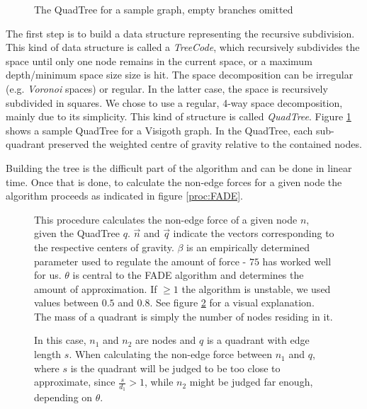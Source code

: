 \documentclass[a4paper,11pt,titlepage]{article}
\begin{document}
\begin{figure}[ht!]
  \centering
  \hspace{4pt}
  \caption{The QuadTree for a sample graph, empty branches omitted}
  \label{fig:quadtree}
\end{figure}

The first step is to build a data structure representing the recursive
subdivision. This kind of data structure is called a \emph{TreeCode},
which recursively subdivides the space until only one node remains in
the current space, or a maximum depth/minimum space size size is
hit. The space decomposition can be irregular (e.g. \emph{Voronoi}
spaces) or regular. In the latter case, the space is recursively
subdivided in squares. We chose to use a regular, 4-way space
decomposition, mainly due to its simplicity. This kind of structure is
called \emph{QuadTree}. Figure \ref{fig:quadtree} shows a sample
QuadTree for a Visigoth graph. In the QuadTree, each sub-quadrant
preserved the weighted centre of gravity relative to the contained
nodes.

Building the tree is the difficult part of the algorithm and can be
done in linear time. Once that is done, to calculate the non-edge
forces for a given node the algorithm proceeds as indicated in figure
\ref{proc:FADE}.

\begin{figure}[ht!]
  \begin{minipage}[b]{0.5\linewidth}
    
    \caption{This procedure calculates the non-edge force of a given
      node \(n\), given the QuadTree \(q\). \(\vec{n}\) and
      \(\vec{q}\) indicate the vectors corresponding to the respective
      centers of gravity. \(\beta\) is an empirically determined
      parameter used to regulate the amount of force - \(75\) has
      worked well for us. \(\theta\) is central to the FADE algorithm
      and determines the amount of approximation. If \(\geq 1\) the
      algorithm is unstable, we used values between \(0.5\) and
      \(0.8\). See figure \ref{fig:theta} for a visual
      explanation. The mass of a quadrant is simply the number of
      nodes residing in it. }
    \label{proc:FADE}
  \end{minipage}
  \hspace{10pt}
  \begin{minipage}[b]{0.5\linewidth}
    \centering
    
    \caption{In this case, \(n_1\) and \(n_2\) are nodes and \(q\) is
      a quadrant with edge length \(s\). When calculating the non-edge
      force between \(n_1\) and \(q\), where \(s\) is the quadrant
      will be judged to be too close to approximate, since
      \(\frac{s}{d_1} > 1\), while \(n_2\) might be judged far enough,
      depending on \(\theta\).}
    \label{fig:theta}
  \end{minipage}
\end{figure}
\end{document}
